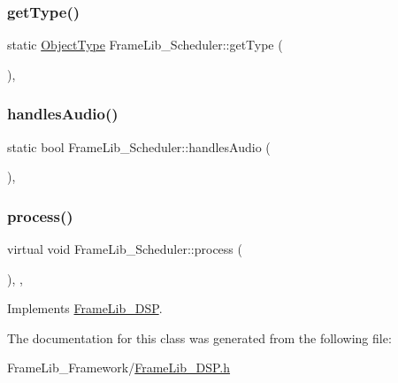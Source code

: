 \subsubsection{\texorpdfstring{get\+Type()}{getType()}}
{\footnotesize\ttfamily static \hyperlink{_frame_lib___types_8h_a842c5e2e69277690b064bf363c017980}{Object\+Type} Frame\+Lib\+\_\+\+Scheduler\+::get\+Type (\begin{DoxyParamCaption}{ }\end{DoxyParamCaption})\hspace{0.3cm}{\ttfamily [inline]}, {\ttfamily [static]}}

\mbox{\label{class_frame_lib___scheduler_a6ab661f5a92b9cc0096af2cde6c6f513}} 
\subsubsection{\texorpdfstring{handles\+Audio()}{handlesAudio()}}
{\footnotesize\ttfamily static bool Frame\+Lib\+\_\+\+Scheduler\+::handles\+Audio (\begin{DoxyParamCaption}{ }\end{DoxyParamCaption})\hspace{0.3cm}{\ttfamily [inline]}, {\ttfamily [static]}}

\mbox{\label{class_frame_lib___scheduler_aa5c10907d7d11e1beef86d19b8e93601}} 
\subsubsection{\texorpdfstring{process()}{process()}}
{\footnotesize\ttfamily virtual void Frame\+Lib\+\_\+\+Scheduler\+::process (\begin{DoxyParamCaption}{ }\end{DoxyParamCaption})\hspace{0.3cm}{\ttfamily [inline]}, {\ttfamily [protected]}, {\ttfamily [virtual]}}



Implements \hyperlink{class_frame_lib___d_s_p}{Frame\+Lib\+\_\+\+D\+SP}.



The documentation for this class was generated from the following file\+:\begin{DoxyCompactItemize}
\item 
Frame\+Lib\+\_\+\+Framework/\hyperlink{_frame_lib___d_s_p_8h}{Frame\+Lib\+\_\+\+D\+S\+P.\+h}\end{DoxyCompactItemize}
